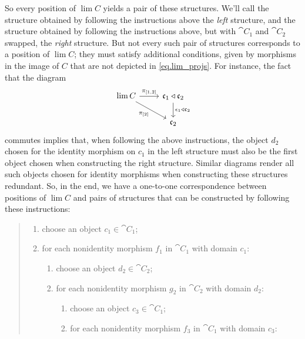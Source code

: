 \documentclass[Book-Poly]{subfiles}
\begin{document}
\begin{example}
So every position of $\lim C$ yields a pair of these structures.
We'll call the structure obtained by following the instructions above the \emph{left} structure, and the structure obtained by following the instructions above, but with $\cat{C}_1$ and $\cat{C}_2$ swapped, the \emph{right} structure.
But not every such pair of structures corresponds to a position of $\lim C$; they must satisfy additional conditions, given by morphisms in the image of $C$ that are not depicted in \eqref{eq.lim_projs}.
For instance, the fact that the diagram
\begin{equation}
\begin{tikzcd}
    \lim C \ar[r, "\pi_{[1,2]}"] \ar[dr, "\pi_{[2]}"'] & \ema{c}_1 \tri \ema{c}_2 \ar[d, "\epsilon_1 \tri \ema{c}_2"] \\
    & \ema{c}_2
\end{tikzcd}
\end{equation}
commutes implies that, when following the above instructions, the object $d_2$ chosen for the identity morphism on $c_1$ in the left structure must also be the first object chosen when constructing the right structure.
Similar diagrams render all such objects chosen for identity morphisms when constructing these structures redundant.
So, in the end, we have a one-to-one correspondence between positions of $\lim C$ and pairs of structures that can be constructed by following these instructions:
\begin{quote}
\begin{enumerate}[label=1.\arabic*.]
    \item choose an object $c_1 \in \cat{C}_1$;
    \item for each nonidentity morphism $f_1$ in $\cat{C}_1$ with domain $c_1$:
    \begin{enumerate}[label=2.\arabic*.]
        \item choose an object $d_2 \in \cat{C}_2$;
        \item for each nonidentity morphism $g_2$ in $\cat{C}_2$ with domain $d_2$:
        \begin{enumerate}[label=3.\arabic*.]
            \item choose an object $c_3 \in \cat{C}_1$;
            \item for each nonidentity morphism $f_3$ in $\cat{C}_1$ with domain $c_3$:
            

\end{enumerate}
\end{enumerate}
\end{enumerate}
\end{quote}
\end{example}
\end{document}
